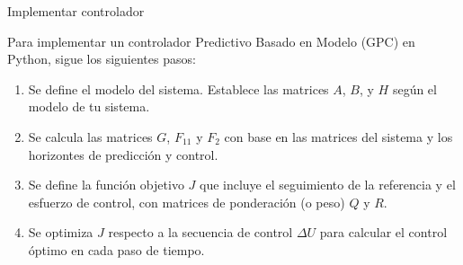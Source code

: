 \documentclass{beamer}
\begin{document}
\begin{frame}{Implementar controlador}
\begin{justify}
Para implementar un controlador Predictivo Basado en Modelo (GPC) en Python, sigue los siguientes pasos:

\vspace{0.3cm}
\begin{itemize}  
\begin{enumerate}

    \vspace{0.2cm}
    \item Se define el modelo del sistema. Establece las matrices \( A \), \( B \), y \( H \) según el modelo de tu sistema.

    \vspace{0.2cm}
    \item Se calcula las matrices \( G \), \( F_{11} \) y \( F_2 \) con base en las matrices del sistema y los horizontes de predicción y control.

    \vspace{0.2cm}
    \item Se define la función objetivo \( J \) que incluye el seguimiento de la referencia y el esfuerzo de control, con matrices de ponderación (o peso) \( Q \) y \( R \).

    \vspace{0.2cm}
    \item Se optimiza \( J \) respecto a la secuencia de control \( \Delta U \) para calcular el control óptimo en cada paso de tiempo.
    
\end{enumerate}
\end{itemize}
\end{justify}
\end{frame}
\end{document}
